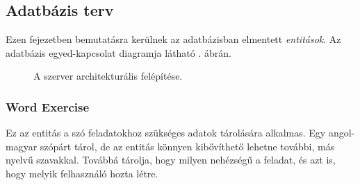\documentclass[11pt, a4paper]{article}
\begin{document}
    \subsection{Adatbázis terv}
    Ezen fejezetben bemutatásra kerülnek az adatbázisban elmentett \emph{entitások}. Az adatbázis egyed-kapcsolat diagramja látható . ábrán.
    
    \begin{figure}[htbp]
    	\center
    	\caption{A szerver architekturális felépítése.}
    	\label{fig:er_diag}
    \end{figure}
    
    \subsubsection{Word Exercise}
    Ez az entitás a szó feladatokhoz szükséges adatok tárolására alkalmas. Egy angol-magyar szópárt tárol, de az entitás könnyen kibővíthető lehetne további, más nyelvű szavakkal. Továbbá tárolja, hogy milyen nehézségű a feladat, és azt is, hogy melyik felhasználó hozta létre.
    
\end{document}
